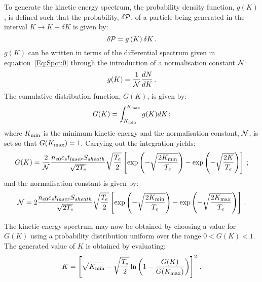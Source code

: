 To generate the kinetic energy spectrum, the probability density
function, $g(K)$, is defined such that the probability,
$\delta {\cal P}$, of a particle being generated in the interval
$K \rightarrow K + \delta K$ is given
by:
\begin{equation}
   \delta {\cal P} = g \left( K \right) \delta K \, .
\end{equation}
$g(K)$ can be written in terms of the differential spectrum
given in equation~\ref{Eq:Spct:0} through the introduction of a
normalisation constant ${\cal N}$:
\begin{equation}
  g(K) = \frac{1}{\cal N} \frac{dN}{dK} \, .
\end{equation}
The cumulative distribution function, $G(K)$, is given by:
\begin{equation}
  G(K) = \int_{K_{\rm min}}^{K_{\rm max}} g(K)
                                               dK \,;
\end{equation}
where $K_{\rm min}$ is the minimum kinetic energy and the
normalisation constant, ${\cal N}$, is set so that
$G(K_{\rm max}) = 1$.
Carrying out the integration yields:
\begin{equation}
  G(K) = \frac{2}{\cal N}
                   \frac{n_{e0} c_{s} t_{laser} S_{sheath}} {\sqrt{2T_{e}}}
                   \sqrt{\frac{T_{e}}{2}}
                   \left[
                         \exp\left(
                                   -\sqrt{\frac{2K_{\rm min}}{T_{e}}}
                             \right) -
                         \exp\left(
                                   -\sqrt{\frac{2K}{T_{e}}}
                             \right)
                   \right] \, ;
  \label{Eq:Src:GofK}
\end{equation}
and the normalisation constant is given by:
\begin{equation}
  {\cal N} = 2
             \frac{n_{e0} c_{s} t_{laser} S_{sheath}} {\sqrt{2T_{e}}}
             \sqrt{\frac{T_{e}}{2}}
             \left[
                   \exp\left(
                             -\sqrt{\frac{2K_{\rm min}}{T_{e}}}
                             \right) -
                         \exp\left(
                                   -\sqrt{\frac{2K_{\rm max}}{T_{e}}}
                              \right)
             \right] \, .
  \label{Eq:Src:calN}
\end{equation}

The kinetic energy spectrum may now be obtained by choosing a value
for $G(K)$ using a probability distribution uniform over the
range $0 < G(K) < 1$.
The generated value of $K$ is obtained by evaluating:
\begin{equation}
  K = \left[ \sqrt{K_{\rm min}} - \sqrt{\frac{T_e}{2}}
             \ln \left( 1 - \frac{G(K)}{G(K_{\rm max})} \right)
      \right]^2 \, .
  \label{Eq:Src:K}
\end{equation}

